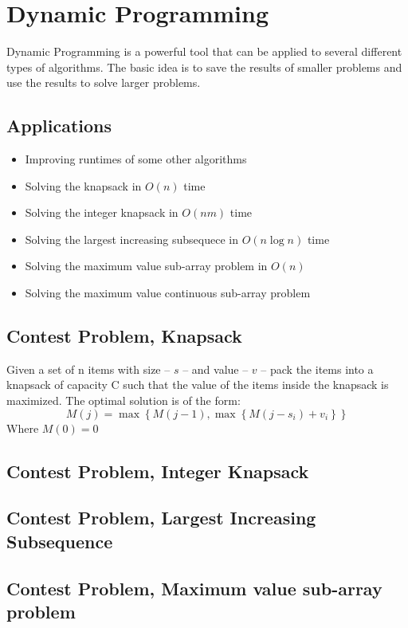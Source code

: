 \section{Dynamic Programming}
Dynamic Programming is a powerful tool that can be applied to several different types of algorithms.\cite{dppractice}
The basic idea is to save the results of smaller problems and use the results to solve larger problems.

\subsection{Applications}
\begin{itemize}
	\item	Improving runtimes of some other algorithms
	\item	Solving the knapsack in $O(n)$ time
	\item	Solving the integer knapsack in $O(nm)$ time
	\item	Solving the largest increasing subsequece in $O(n \log n)$ time
	\item	Solving the maximum value sub-array problem in $O(n)$
	\item	Solving the maximum value continuous sub-array problem
\end{itemize}

\subsection{Contest Problem, Knapsack}
Given a set of n items with size -- $s$ -- and value -- $v$ -- pack the items into a knapsack of capacity C such that the value of the items inside the knapsack is maximized.  The optimal solution is of the form:
$$M(j) = \max \left\{M(j-1), \max \left\{M(j - s_i) + v_i \right\}\right\}$$
Where $M(0) = 0$


\subsection{Contest Problem, Integer Knapsack}
\subsection{Contest Problem, Largest Increasing Subsequence}
\subsection{Contest Problem, Maximum value sub-array problem}
